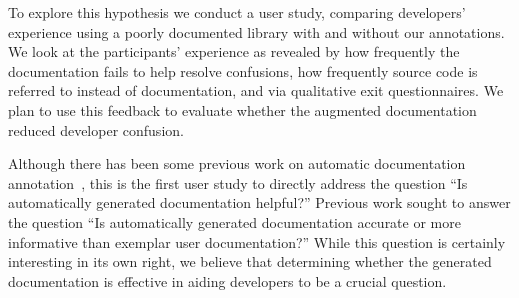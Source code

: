 To explore this hypothesis we conduct a user study, comparing developers'
experience using a poorly documented library with and without our
annotations.  We look at the participants' experience as revealed
by how frequently the
documentation fails to help resolve confusions, how frequently source
code is referred to instead of documentation, and via qualitative exit
questionnaires.  We plan to use this feedback to evaluate whether the augmented
documentation reduced developer confusion.

Although there has been some previous work on automatic
documentation annotation~\cite{autodoc}, this is the first user study
to directly address the question
``Is automatically generated documentation helpful?''
Previous work sought to answer the question
``Is automatically generated documentation accurate or more informative than
exemplar user documentation?''
While this question is certainly interesting in its own right,
we believe that determining whether the generated documentation is effective in aiding
developers to be a crucial question.


